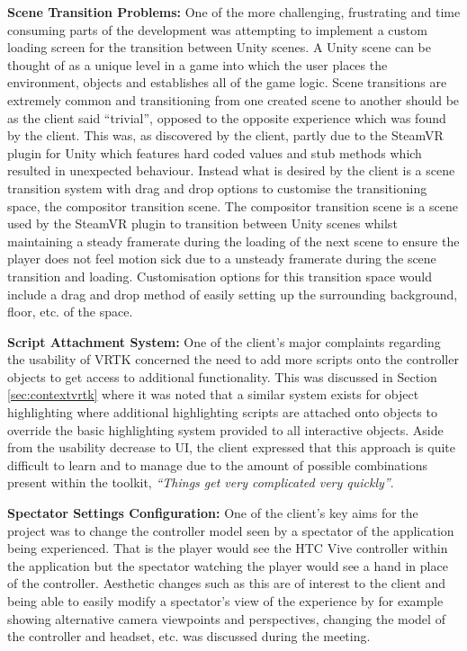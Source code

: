 \documentclass{l4proj}
\begin{document}
\textbf{Scene Transition Problems:}
One of the more challenging, frustrating and time consuming parts of the development was attempting to implement a custom loading screen for the transition between Unity scenes. A Unity scene can be thought of as a unique level in a game into which the user places the environment, objects and establishes all of the game logic. Scene transitions are extremely common and transitioning from one created scene to another should be as the client said ``trivial'', opposed to the opposite experience which was found by the client. This was, as discovered by the client, partly due to the SteamVR plugin for Unity which features hard coded values and stub methods which resulted in unexpected behaviour. Instead what is desired by the client is a scene transition system with drag and drop options to customise the transitioning space, the compositor transition scene. The compositor transition scene is a scene used by the SteamVR plugin to transition between Unity scenes whilst maintaining a steady framerate during the loading of the next scene to ensure the player does not feel motion sick due to a unsteady framerate during the scene transition and loading. Customisation options for this transition space would include a drag and drop method of easily setting up the surrounding background, floor, etc. of the space.

\textbf{Script Attachment System:}
One of the client's major complaints regarding the usability of VRTK concerned the need to add more scripts onto the controller objects to get access to additional functionality. This was discussed in Section \ref{sec:contextvrtk} where it was noted that a similar system exists for object highlighting where additional highlighting scripts are attached onto objects to override the basic highlighting system provided to all interactive objects. Aside from the usability decrease to UI, the client expressed that this approach is quite difficult to learn and to manage due to the amount of possible combinations present within the toolkit, \textit{``Things get very complicated very quickly''}.

\textbf{Spectator Settings Configuration:}
One of the client's key aims for the project was to change the controller model seen by a spectator of the application being experienced. That is the player would see the HTC Vive controller within the application but the spectator watching the player would see a hand in place of the controller. Aesthetic changes such as this are of interest to the client and being able to easily modify a spectator's view of the experience by for example showing alternative camera viewpoints and perspectives, changing the model of the controller and headset, etc. was discussed during the meeting.
\end{document}
